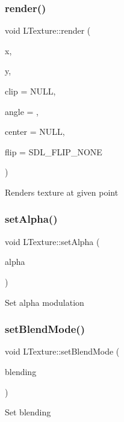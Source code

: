 \subsubsection{\texorpdfstring{render()}{render()}}
{\footnotesize\ttfamily void L\+Texture\+::render (\begin{DoxyParamCaption}\item[{int}]{x,  }\item[{int}]{y,  }\item[{S\+D\+L\+\_\+\+Rect $\ast$}]{clip = {\ttfamily NULL},  }\item[{double}]{angle = {},  }\item[{S\+D\+L\+\_\+\+Point $\ast$}]{center = {\ttfamily NULL},  }\item[{S\+D\+L\+\_\+\+Renderer\+Flip}]{flip = {\ttfamily SDL\+\_\+FLIP\+\_\+NONE} }\end{DoxyParamCaption})}

Renders texture at given point \mbox{\label{class_l_texture_ab4e51b54752ae7b54614078f9128a9c0}} 
\subsubsection{\texorpdfstring{set\+Alpha()}{setAlpha()}}
{\footnotesize\ttfamily void L\+Texture\+::set\+Alpha (\begin{DoxyParamCaption}\item[{Uint8}]{alpha }\end{DoxyParamCaption})}

Set alpha modulation \mbox{\label{class_l_texture_aa1fe07070f715bf3981c129ae1619a4e}} 
\subsubsection{\texorpdfstring{set\+Blend\+Mode()}{setBlendMode()}}
{\footnotesize\ttfamily void L\+Texture\+::set\+Blend\+Mode (\begin{DoxyParamCaption}\item[{S\+D\+L\+\_\+\+Blend\+Mode}]{blending }\end{DoxyParamCaption})}

Set blending \mbox{\label{class_l_texture_a4ccf201515ecb158b137394d41ed9077}} 
